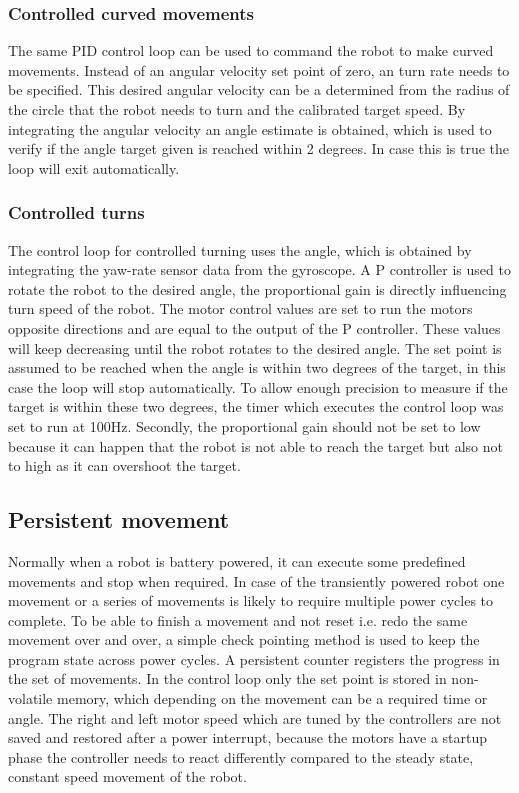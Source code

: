 \subsubsection{Controlled curved movements} 

The same PID control loop can be used to command the robot to make curved movements.
Instead of an angular velocity set point of zero, an turn rate needs to be specified.
This desired angular velocity can be a determined from the radius of the circle that the robot needs to turn and the calibrated target speed.
By integrating the angular velocity an angle estimate is obtained, which is used to verify if the angle target given is reached within 2 degrees.
In case this is true the loop will exit automatically.

\subsubsection{Controlled turns}

The control loop for controlled turning uses the angle, which is obtained by integrating the yaw-rate sensor data from the gyroscope.
A P controller is used to rotate the robot to the desired angle, the proportional gain is directly influencing turn speed of the robot.
The motor control values are set to run the motors opposite directions and are equal to the output of the P controller.
These values will keep decreasing until the robot rotates to the desired angle.
The set point is assumed to be reached when the angle is within two degrees of the target, in this case the loop will stop automatically.
To allow enough precision to measure if the target is within these two degrees, the timer which executes the control loop was set to run at 100Hz.
Secondly, the proportional gain should not be set to low because it can happen that the robot is not able to reach the target but also not to high as it can overshoot the target.

\subsection{Persistent movement}

Normally when a robot is battery powered, it can execute some predefined movements and stop when required.
In case of the transiently powered robot one movement or a series of movements is likely to require multiple power cycles to complete.
To be able to finish a movement and not reset i.e. redo the same movement over and over, a simple check pointing method is used to keep the program state across power cycles.
A persistent counter registers the progress in the set of movements.
In the control loop only the set point is stored in non-volatile memory, which depending on the movement can be a required time or angle.
The right and left motor speed which are tuned by the controllers are not saved and restored after a power interrupt, because the motors have a startup phase the controller needs to react differently compared to the steady state, constant speed movement of the robot. 